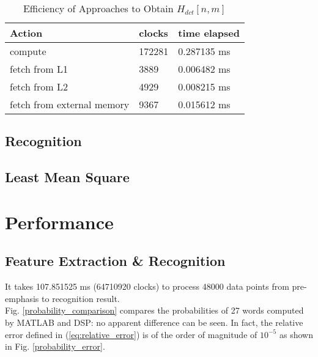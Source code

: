 \begin{table}[H]
\centering
\begin{tabu} to \textwidth {XXX}
\toprule
Action &clocks &time elapsed\\
\hline
compute &172281 &0.287135 ms\\
\hline
fetch from L1 &3889 &0.006482 ms\\
\hline
fetch from L2 &4929 &0.008215 ms\\
\hline
fetch from external memory &9367 &0.015612 ms\\
\bottomrule
\end{tabu}
\caption{Efficiency of Approaches to Obtain $H_{dct}[n, m]$}
\label{clocks-dct}
\end{table}


\subsection{Recognition}


\subsection{Least Mean Square}


\section{Performance}

\subsection{Feature Extraction \& Recognition}

It takes 107.851525 ms (64710920 clocks) to process 48000 data points from pre-emphasis to recognition result.\\

Fig. \ref{probability_comparison} compares the probabilities of 27 words computed by MATLAB and DSP: no apparent difference can be seen. In fact, the relative error defined in (\ref{eq:relative_error}) is of the order of magnitude of $10^{-5}$ as shown in Fig. \ref{probability_error}.

